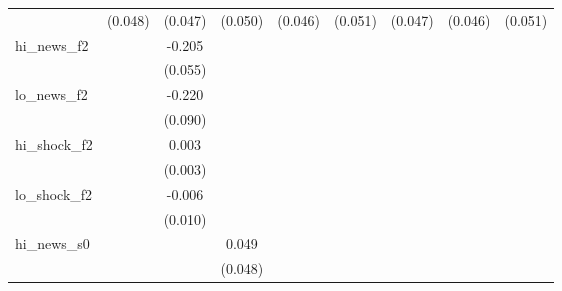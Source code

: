 {\begin{tabular}{l*{8}{c}}
            &     (0.048)         &     (0.047)         &     (0.050)         &     (0.046)         &     (0.051)         &     (0.047)         &     (0.046)         &     (0.051)         \\
\addlinespace
hi\_news\_f2  &                     &      -0.205\sym{***}&                     &                     &                     &                     &                     &                     \\
            &                     &     (0.055)         &                     &                     &                     &                     &                     &                     \\
\addlinespace
lo\_news\_f2  &                     &      -0.220\sym{**} &                     &                     &                     &                     &                     &                     \\
            &                     &     (0.090)         &                     &                     &                     &                     &                     &                     \\
\addlinespace
hi\_shock\_f2 &                     &       0.003         &                     &                     &                     &                     &                     &                     \\
            &                     &     (0.003)         &                     &                     &                     &                     &                     &                     \\
\addlinespace
lo\_shock\_f2 &                     &      -0.006         &                     &                     &                     &                     &                     &                     \\
            &                     &     (0.010)         &                     &                     &                     &                     &                     &                     \\
\addlinespace
hi\_news\_s0  &                     &                     &       0.049         &                     &                     &                     &                     &                     \\
            &                     &                     &     (0.048)         &                     &                     &                     &                     &                     \\

\end{tabular}}
